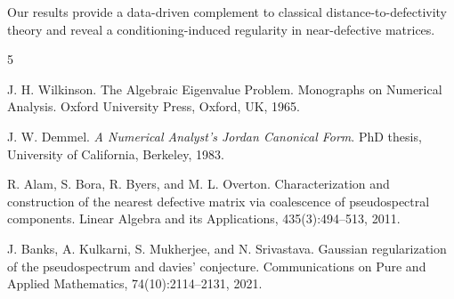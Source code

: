 \documentclass[10pt,a4paper]{article}
\begin{document}
Our results provide a data-driven complement to classical distance-to-defectivity theory and reveal a conditioning-induced regularity in near-defective matrices.

\bigskip


\renewcommand{\refname}{}
\vspace*{-1.25cm}

\begin{thebibliography}{5}

J. H. Wilkinson. The Algebraic Eigenvalue Problem. Monographs on Numerical Analysis. Oxford
University Press, Oxford, UK, 1965.

J. W. Demmel. \textit{A Numerical Analyst’s Jordan Canonical Form}. PhD thesis, University of California, Berkeley, 1983.

 R. Alam, S. Bora, R. Byers, and M. L. Overton. Characterization and construction of the nearest
defective matrix via coalescence of pseudospectral components. Linear Algebra and its Applications,
435(3):494–513, 2011.

J. Banks, A. Kulkarni, S. Mukherjee, and N. Srivastava. Gaussian regularization of the pseudospectrum
and davies’ conjecture. Communications on Pure and Applied Mathematics, 74(10):2114–2131, 2021.

\end{thebibliography}
\end{document}
